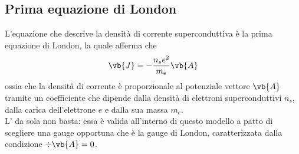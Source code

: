 \subsection{Prima equazione di London}
L'equazione che descrive la densità di corrente superconduttiva è la prima equazione di London, la quale afferma che
\begin{equation}
   \vb{J}=-\frac{n_s e^2}{m_e} \vb{A}
   \label{eq:prima_equazione_di_London}
\end{equation}
ossia che la densità di corrente è proporzionale al potenziale vettore $\vb{A}$ tramite un coefficiente che dipende dalla densità di elettroni superconduttivi $n_s$, dalla carica dell'elettrone $e$ e dalla sua massa $m_e$.\\
L' da sola non basta: essa è valida all'interno di questo modello a patto di scegliere una gauge opportuna che è la gauge di London, caratterizzata dalla condizione $\div{\vb{A}} = 0$.\\
